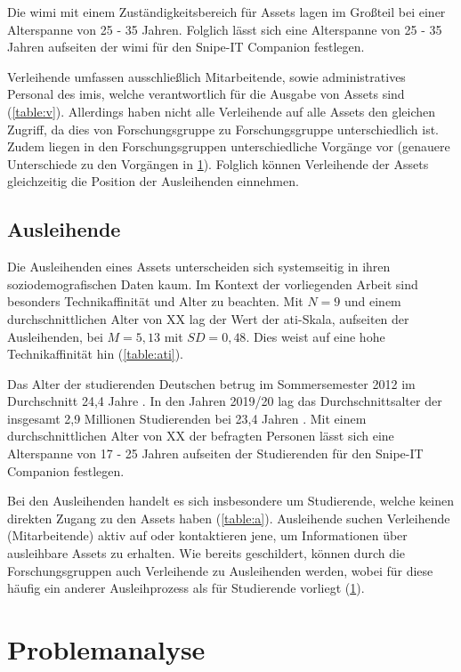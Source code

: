 Die \ac{wimi} mit einem Zuständigkeitsbereich für Assets lagen im Großteil bei einer
Alterspanne von 25 - 35 Jahren. Folglich lässt sich eine Alterspanne von 25 - 35 Jahren aufseiten
der \ac{wimi} für den Snipe-IT Companion festlegen.

Verleihende umfassen ausschließlich Mitarbeitende, sowie administratives Personal des \ac{imis},
welche verantwortlich für die Ausgabe von Assets sind (\ref{table:v}). Allerdings haben nicht alle
Verleihende auf alle Assets den gleichen Zugriff, da dies von Forschungsgruppe zu Forschungsgruppe
unterschiedlich ist. Zudem liegen in den Forschungsgruppen unterschiedliche Vorgänge vor (genauere
Unterschiede zu den Vorgängen in \ref{section:iststand}). Folglich können Verleihende der Assets
gleichzeitig die Position der Ausleihenden einnehmen.

\subsection{Ausleihende}
Die Ausleihenden eines Assets unterscheiden sich systemseitig in ihren
soziodemografischen Daten kaum. Im Kontext der vorliegenden Arbeit sind besonders Technikaffinität
und Alter zu beachten.
Mit $N=9$ und einem durchschnittlichen Alter von XX lag der Wert der \ac{ati}-Skala, aufseiten der
Ausleihenden, bei $M=5,13$ mit $SD=0,48$. Dies weist auf eine hohe Technikaffinität hin
(\ref{table:ati}).

Das Alter der studierenden Deutschen betrug im Sommersemester 2012 im Durchschnitt 24,4 Jahre
\cite{middendorff2017wirtschaftliche}. In den Jahren 2019/20 lag das Durchschnittsalter der
insgesamt 2,9 Millionen Studierenden bei 23,4 Jahren \cite{noauthor_studierende_nodate}. Mit einem
durchschnittlichen Alter von XX der befragten Personen lässt sich eine Alterspanne von 17 - 25
Jahren aufseiten der Studierenden für den Snipe-IT Companion festlegen.

Bei den Ausleihenden handelt es sich insbesondere um Studierende, welche keinen direkten Zugang zu
den Assets haben (\ref{table:a}). Ausleihende suchen Verleihende (Mitarbeitende) aktiv auf oder
kontaktieren jene, um Informationen über ausleihbare Assets zu erhalten. Wie bereits geschildert,
können durch die Forschungsgruppen auch Verleihende zu Ausleihenden werden, wobei
für diese häufig ein anderer Ausleihprozess als für Studierende vorliegt (\ref{section:iststand}).


\section{Problemanalyse}
\label{section:iststand}

